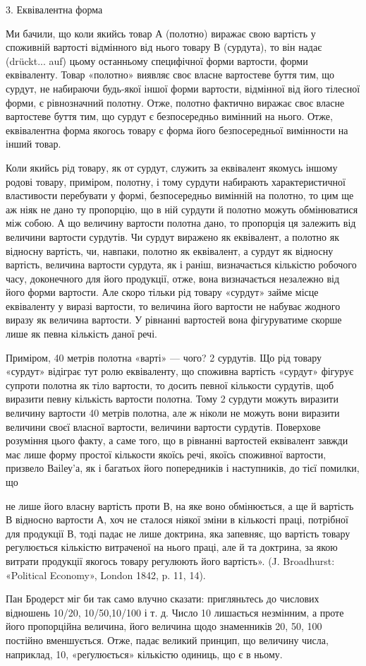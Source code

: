 3. Еквівалентна форма

Ми бачили, що коли якийсь товар А (полотно) виражає свою вартість у споживній вартості відмінного
від нього товару В (сурдута), то він надає (drückt... auf) цьому останньому специфічної форми
вартости, форми еквіваленту. Товар «полотно» виявляє своє власне вартостеве буття тим, що сурдут, не
набираючи будь-якої іншої форми вартости, відмінної від його тілесної форми, є рівнозначний полотну.
Отже, полотно фактично виражає своє власне вартостеве буття тим, що сурдут є безпосередньо вимінний
на нього. Отже, еквівалентна форма якогось товару є форма його безпосередньої вимінности на інший
товар.

Коли якийсь рід товару, як от сурдут, служить за еквівалент якомусь іншому родові товару, приміром,
полотну, і тому сурдути набирають характеристичної властивости перебувати у формі, безпосередньо
вимінній на полотно, то цим ще аж ніяк не дано ту пропорцію, що в ній сурдути й полотно можуть
обмінюватися між собою. А що величину вартости полотна дано, то пропорція ця залежить від величини
вартости сурдутів. Чи сурдут виражено як еквівалент, а полотно як відносну вартість, чи, навпаки,
полотно як еквівалент, а сурдут як відносну вартість, величина вартости сурдута, як і раніш,
визначається кількістю робочого часу, доконечного для його продукції, отже, вона  визначається
незалежно від його форми вартости. Але скоро тільки рід товару «сурдут» займе місце еквіваленту у
виразі вартости, то величина його вартости не набуває жодного виразу як величина вартости. У
рівнанні вартостей вона фігуруватиме скорше лише як певна кількість даної речі.

Приміром, 40 метрів полотна «варті» — чого? 2 сурдутів. Що рід товару «сурдут» відіграє тут ролю
еквіваленту, що споживна вартість «сурдут» фігурує супроти полотна як тіло вартости, то досить
певної кількости сурдутів, щоб виразити певну кількість вартости полотна. Тому 2 сурдути можуть
виразити величину вартости 40 метрів полотна, але ж ніколи не можуть вони виразити величини своєї
власної вартости, величини вартости сурдутів. Поверхове розуміння цього факту, а саме того, що в
рівнанні вартостей еквівалент завжди має лише форму простої кількости якоїсь речі, якоїсь споживної
вартости, призвело Ваіlеу’а, як і багатьох його попередників і наступників, до тієї помилки, що

не лише його власну вартість проти В, на яке воно обмінюється, а ще й вартість В відносно вартости
А, хоч не сталося ніякої зміни в кількості праці, потрібної для продукції В, тоді падає не лише
доктрина, яка запевняє, що вартість товару регулюється кількістю витраченої на нього праці, але й та
доктрина, за якою витрати продукції якогось товару регулюють його вартість». (J. Broadhurst:
«Political Economy», London 1842, p. 11, 14).

Пан Бродерст міг би так само влучно сказати: пригляньтесь до числових відношень 10/20, 10/50,10/100
і т. д. Число 10 лишається незмінним, а проте його пропорційна величина, його величина щодо
знаменників 20, 50, 100 постійно вменшується. Отже, падає великий принцип, що величину числа,
наприклад, 10, «реґулюється» кількістю одиниць, що є в ньому.
